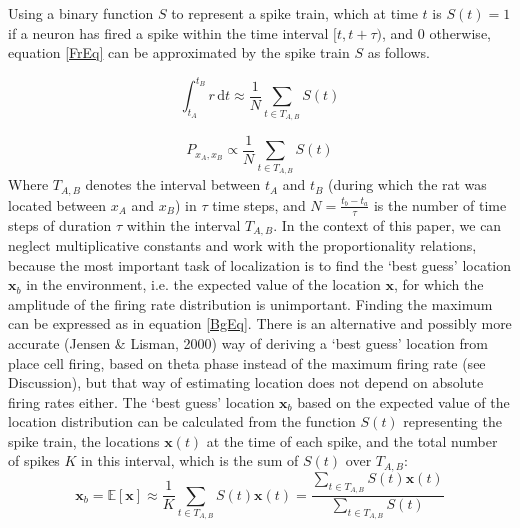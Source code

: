 
Using a binary function $ S $ to represent a spike train, which at time $ t $ is $ S(t)=1 $ if a neuron has fired a spike within the time interval $ [t, t+\tau) $, and $0$ otherwise, equation \eqref{FrEq} can be approximated by the spike train $ S $ as follows. 

\begin{equation}\label{McEq}
\int_{t_A}^{t_B}{r \, \mathrm{d}t} \approx \frac{1}{N} \sum_{t \in T_{A,B}}{S(t)}
\end{equation} 

\begin{equation}\label{SpkEq}
P_{x_A,x_B} \propto \frac{1}{N} \sum_{t \in T_{A,B}}{S(t)}
\end{equation} 
Where $ T_{A,B} $ denotes the interval between $ t_A $ and $ t_B $ (during which the rat was located between $ x_A $ and $ x_B $) in $ \tau $ time steps, and $ N=\frac{t_b-t_a}{\tau} $ is the number of time steps of duration $\tau$ within the interval $T_{A,B}$. In the context of this paper, we can neglect multiplicative constants and work with the proportionality relations, because the most important task of localization is to find the `best guess' location $ \boldsymbol x_b $ in the environment, i.e. the expected value of the location $ \boldsymbol x $, for which the amplitude of the firing rate distribution is unimportant. Finding the maximum can be expressed as in equation \eqref{BgEq}. There is an alternative and possibly more accurate (Jensen \& Lisman, 2000) way of deriving a `best guess' location from place cell firing, based on theta phase instead of the maximum firing rate (see Discussion), but that way of estimating location does not depend on absolute firing rates either.
The `best guess' location $\boldsymbol x_b$ based on the expected value of the location distribution can be calculated from the function $S(t)$ representing the spike train, the locations $\boldsymbol x(t)$ at the time of each spike, and the total number of spikes $K$ in this interval, which is the sum of $S(t)$ over $T_{A,B}$: 
\begin{equation}\label{BgEq}
\boldsymbol x_b = \mathbb{E}[\boldsymbol x] \approx \frac{1}{K} \sum_{t \in T_{A,B}}{S(t) \boldsymbol x(t)} = \frac{\sum_{t \in T_{A,B}}{S(t) \boldsymbol x(t)}}{\sum_{t \in T_{A,B}}{S(t)}}
\end{equation} 

